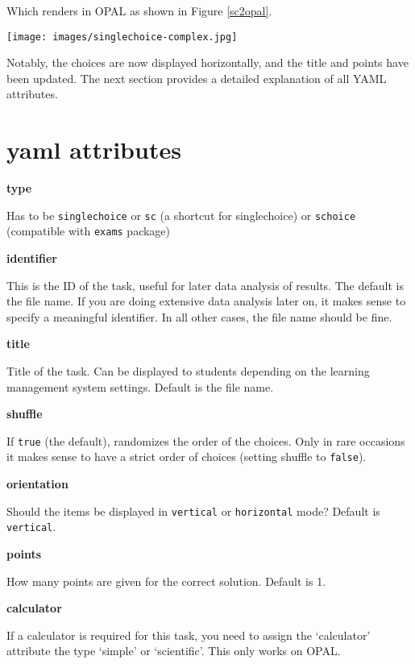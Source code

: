\documentclass[twoside]{tufte-book}
\begin{document}
Which renders in OPAL as shown in Figure \ref{sc2opal}.

\begin{figure*}
\centering
\texttt{[image: images/singlechoice-complex.jpg]}
\caption{\label{sc2opal}More complex single choice task rendered in OPAL}
\end{figure*}

Notably, the choices are now displayed horizontally, and the title and points have been updated. The next section provides a detailed explanation of all YAML attributes.

\section{yaml attributes}\label{yaml-attributes}

\noindent\textbf{type}\label{type}

Has to be \texttt{singlechoice} or \texttt{sc} (a shortcut for singlechoice) or \texttt{schoice} (compatible with \texttt{exams} package)

\noindent\textbf{identifier}\label{identifier}

This is the ID of the task, useful for later data analysis of results. The default is the file name. If you are doing extensive data analysis later on, it makes sense to specify a meaningful identifier. In all other cases, the file name should be fine.

\noindent\textbf{title}\label{title}

Title of the task. Can be displayed to students depending on the learning management system settings. Default is the file name.

\noindent\textbf{shuffle}\label{shuffle}

If \texttt{true} (the default), randomizes the order of the choices. Only in rare occasions it makes sense to have a strict order of choices (setting shuffle to \texttt{false}).

\noindent\textbf{orientation}\label{orientation}

Should the items be displayed in \texttt{vertical} or \texttt{horizontal} mode? Default is \texttt{vertical}.

\noindent\textbf{points}\label{points}

How many points are given for the correct solution. Default is 1.

\noindent\textbf{calculator}\label{calculator}

If a calculator is required for this task, you need to assign the `calculator' attribute the type `simple' or `scientific'. This only works on OPAL.
\end{document}

